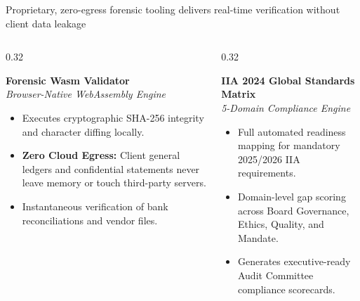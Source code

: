 \documentclass[aspectratio=169, 8pt]{beamer}
\begin{document}
\begin{frame}{Proprietary, zero-egress forensic tooling delivers real-time verification without client data leakage}
    \vspace{-0.15cm}
    \begin{columns}[T]
        \begin{column}{0.32\textwidth}
            \begin{tcolorbox}[colback=cardBg, colframe=cardBorder, arc=1pt, boxrule=0.5pt, left=3pt, right=3pt, top=3pt, bottom=3pt]
                \textbf{\small \color{obsidian} Forensic Wasm Validator} \\
                \vspace{0.05cm}
                \textit{\tiny \color{terracotta} Browser-Native WebAssembly Engine}
            \end{tcolorbox}
            \begin{itemize}
                \setlength{\itemsep}{1.5pt}
                \item Executes cryptographic SHA-256 integrity and character diffing locally.
                \item \textbf{Zero Cloud Egress:} Client general ledgers and confidential statements never leave memory or touch third-party servers.
                \item Instantaneous verification of bank reconciliations and vendor files.
            \end{itemize}
        \end{column}
        
        \begin{column}{0.32\textwidth}
            \begin{tcolorbox}[colback=cardBg, colframe=cardBorder, arc=1pt, boxrule=0.5pt, left=3pt, right=3pt, top=3pt, bottom=3pt]
                \textbf{\small \color{obsidian} IIA 2024 Global Standards Matrix} \\
                \vspace{0.05cm}
                \textit{\tiny \color{warmGold} 5-Domain Compliance Engine}
            \end{tcolorbox}
            \begin{itemize}
                \setlength{\itemsep}{1.5pt}
                \item Full automated readiness mapping for mandatory 2025/2026 IIA requirements.
                \item Domain-level gap scoring across Board Governance, Ethics, Quality, and Mandate.
                \item Generates executive-ready Audit Committee compliance scorecards.
            \end{itemize}
        \end{column}
        

\end{columns}
\end{frame}
\end{document}
